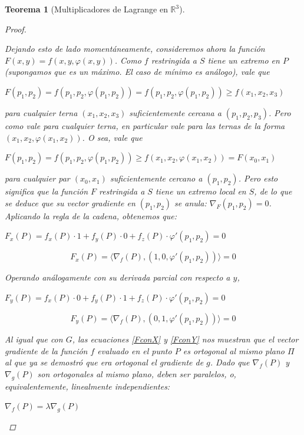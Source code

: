 \documentclass[]{article}
\newtheorem{teo}{Teorema}
\def\R{\mathbb{R}}
\newcommand{\ip}[2]{\langle #1,#2 \rangle}
\begin{document}
\begin{teo}[Multiplicadores de Lagrange en $\R^3$]
\begin{proof}
		~\newline
		
		Dejando esto de lado momentáneamente, consideremos ahora la función $F(x,y) = f(x,y,\varphi(x,y))$. Como $f$ restringida a $S$ tiene un extremo en $P$ (supongamos que es un máximo. El caso de mínimo es análogo), vale que
		\begin{center}
			$F(p_1,p_2) = f(p_1,p_2,\varphi(p_1,p_2)) = f(p_1,p_2,\varphi(p_1,p_2)) \geq f(x_1,x_2,x_3)$
		\end{center}
		para cualquier terna $(x_1,x_2,x_3)$ suficientemente cercana a $(p_1,p_2,p_3)$. Pero como vale para cualquier terna, en particular vale para las ternas de la forma $(x_1,x_2,\varphi(x_1,x_2))$. O sea, vale que
		\begin{center}
			$F(p_1,p_2) = f(p_1,p_2,\varphi(p_1,p_2)) \geq f(x_1,x_2,\varphi(x_1,x_2)) = F(x_0,x_1)$
		\end{center} 
		para cualquier par $(x_0,x_1)$ suficientemente cercano a $(p_1,p_2)$. Pero esto significa que la función $F$ restringida a $S$ tiene un extremo local en $S$, de lo que se deduce que su vector gradiente en $(p_1,p_2)$ se anula: $\nabla_F(p_1,p_2) = 0$. Aplicando la regla de la cadena, obtenemos que:
		\begin{center}
			$F_x(P) = f_x(P)\cdot 1 + f_y(P)\cdot 0 + f_z(P)\cdot\varphi'(p_1,p_2)=0$
		\end{center}
		\begin{equation}\label{FconX}
			F_x(P) = \ip{\nabla_f(P)}{(1,0,\varphi'(p_1,p_2))}=0
		\end{equation}
		
		Operando análogamente con su derivada parcial con respecto a $y$,
		\begin{center}
			$F_y(P) = f_x(P)\cdot 0 + f_y(P)\cdot 1 + f_z(P)\cdot\varphi'(p_1,p_2)=0$
		\end{center}
		\begin{equation}\label{FconY}
			F_y(P) = \ip{\nabla_f(P)}{(0,1,\varphi'(p_1,p_2))}=0
		\end{equation}
		
		Al igual que con $G$, las ecuaciones \eqref{FconX} y \eqref{FconY} nos muestran que el vector gradiente de la función $f$ evaluado en el punto $P$ es ortogonal al mismo plano $\Pi$ al que ya se demostró que era ortogonal el gradiente de $g$. Dado que $\nabla_f(P)$ y $\nabla_g(P)$ son ortogonales al mismo plano, deben ser paralelos, o, equivalentemente, linealmente independientes:
		\begin{center}
			$\nabla_f(P) = \lambda\nabla_g(P)$
		\end{center}
	\end{proof}
\end{teo}
\end{document}
